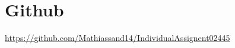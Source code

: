 \documentclass[11pt]{article}
\begin{document}

\newpage

\newpage
\section{Github}
	\url{https://github.com/Mathiassand14/IndividualAssignent02445}
\end{document}
